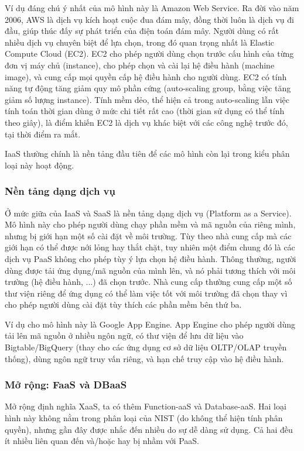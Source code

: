 \documentclass{article}
\begin{document}
Ví dụ đáng chú ý nhất của mô hình này là Amazon Web Service. Ra đời vào năm
2006, AWS là dịch vụ kích hoạt cuộc đua đám mây, đồng thời luôn là dịch vụ đi
đầu, giúp thúc đấy sự phát triển của điện toán đám mây. Người dùng có rất nhiều
dịch vụ chuyên biệt để lựa chọn, trong đó quan trọng nhất là Elastic Compute
Cloud (EC2). EC2 cho phép người dùng chọn trước cấu hình của từng đơn vị máy chủ
(instance), cho phép chọn và cài lại hệ điều hành (machine image), và cung cấp
mọi quyền cấp hệ điều hành cho người dùng. EC2 có tính năng tự động tăng giảm
quy mô phần cứng (auto-scaling group, bằng việc tăng giảm số lượng instance).
Tính mềm dẻo, thể hiện cả trong auto-scaling lẫn việc tính toán thời gian dùng ở
mức chi tiết rất cao (thời gian sử dụng có thể tính theo giây), là điểm khiến
EC2 là dịch vụ khác biệt với các công nghệ trước đó, tại thời điểm ra mắt.

IaaS thường chính là nền tảng đầu tiên để các mô hình còn lại trong kiểu phân
loại này hoạt động.

\subsubsection{Nền tảng dạng dịch vụ}

Ở mức giữa của IaaS và SaaS là nền tảng dạng dịch vụ (Platform as a Service). Mô
hình này cho phép người dùng chạy phần mềm và mã nguồn của riêng mình, nhưng bị
giới hạn một số cài đặt về môi trường. Tùy theo nhà cung cấp mà các giới hạn có
thể được nới lỏng hay thắt chặt, tuy nhiên một điểm chung đó là các dịch vụ PaaS
không cho phép tùy ý lựa chọn hệ điều hành. Thông thường, người dùng được tải
ứng dụng/mã nguồn của mình lên, và nó phải tương thích với môi trường (hệ điều
hành, ...) đã chọn trước. Nhà cung cấp thường cung cấp một số thư viện riêng để
ứng dụng có thể làm việc tốt với môi trường đã chọn thay vì cho phép người dùng
cài đặt tùy thích các phần mềm bên thứ ba.

Ví dụ cho mô hình này là Google App Engine. App Engine cho phép người dùng tải
lên mã nguồn ở nhiều ngôn ngữ, có thư viện để lưu dữ liệu vào Bigtable/BigQuery
(thay cho các ứng dụng cơ sở dữ liệu OLTP/OLAP truyền thống), dùng ngôn ngữ truy
vấn riêng, và hạn chế truy cập vào hệ điều hành.

\subsubsection{Mở rộng: FaaS và DBaaS}

Mở rộng định nghĩa XaaS, ta có thêm Function-aaS và Database-aaS. Hai loại hình
này không nằm trong phân loại của NIST (do không thể hiện tính phân quyền),
nhưng gần đây được nhắc đến nhiều do sự dễ dàng sử dụng. Cả hai đều ít nhiều
liên quan đến và/hoặc hay bị nhầm với PaaS.
\end{document}
